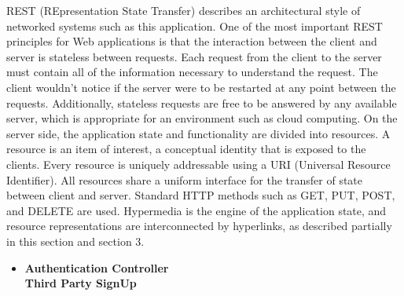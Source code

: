 \begin{legal}
\begin{legal}
				REST (REpresentation State Transfer) describes an architectural style of networked systems such as this application. One of the most important REST principles for Web applications is that the interaction between the client and server is stateless between requests. Each request from the client to the server must contain all of the information necessary to understand the request. The client wouldn't notice if the server were to be restarted at any point between the requests. Additionally, stateless requests are free to be answered by any available server, which is appropriate for an environment such as cloud computing. On the server side, the application state and functionality are divided into resources. A resource is an item of interest, a conceptual identity that is exposed to the clients. Every resource is uniquely addressable using a URI (Universal Resource Identifier). All resources share a uniform interface for the transfer of state between client and server. Standard HTTP methods such as GET, PUT, POST, and DELETE are used. Hypermedia is the engine of the application state, and resource representations are interconnected by hyperlinks, as described partially in this section and section 3.\\

					\begin{itemize}
						\item \textbf{Authentication Controller} \\
						
						\textbf{Third Party SignUp} \\
						

\end{itemize}
\end{legal}
\end{legal}
